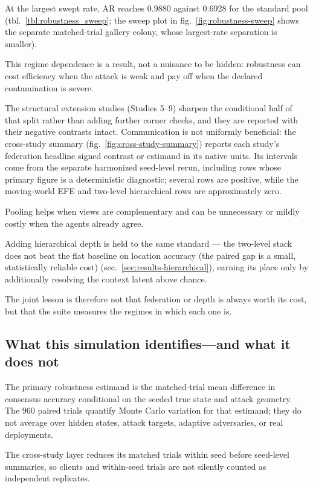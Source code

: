 \documentclass[
  english,
]{article}
\theoremstyle{plain}
\theoremstyle{definition}
\theoremstyle{remark}
\theoremstyle{definition}
\begin{document}
At the largest swept rate, AR reaches 0.9880 against 0.6928 for the
standard pool (tbl.~\ref{tbl:robustness_sweep}; the sweep plot in
fig.~\ref{fig:robustness-sweep} shows the separate matched-trial gallery
colony, whose largest-rate separation is smaller).

This regime dependence is a result, not a nuisance to be hidden:
robustness can cost efficiency when the attack is weak and pay off when
the declared contamination is severe.

The structural extension studies (Studies 5--9) sharpen the conditional
half of that split rather than adding further corner checks, and they
are reported with their negative contrasts intact. Communication is not
uniformly beneficial: the cross-study summary
(fig.~\ref{fig:cross-study-summary}) reports each study's federation
headline signed contrast or estimand in its native units. Its intervals
come from the separate harmonized seed-level rerun, including rows whose
primary figure is a deterministic diagnostic; several rows are positive,
while the moving-world EFE and two-level hierarchical rows are
approximately zero.

Pooling helps when views are complementary and can be unnecessary or
mildly costly when the agents already agree.

Adding hierarchical depth is held to the same standard --- the two-level
stack does not beat the flat baseline on location accuracy (the paired
gap is a small, statistically reliable cost)
(sec.~\ref{sec:results-hierarchical}), earning its place only by
additionally resolving the context latent above chance.

The joint lesson is therefore not that federation or depth is always
worth its cost, but that the suite measures the regimes in which each
one is.

\subsection{What this simulation identifies---and what it does
not}\label{sec:discussion-identifiability}

The primary robustness estimand is the matched-trial mean difference in
consensus accuracy conditional on the seeded true state and attack
geometry. The 960 paired trials quantify Monte Carlo variation for that
estimand; they do not average over hidden states, attack targets,
adaptive adversaries, or real deployments.

The cross-study layer reduces its matched trials within seed before
seed-level summaries, so clients and within-seed trials are not silently
counted as independent replicates.
\end{document}
